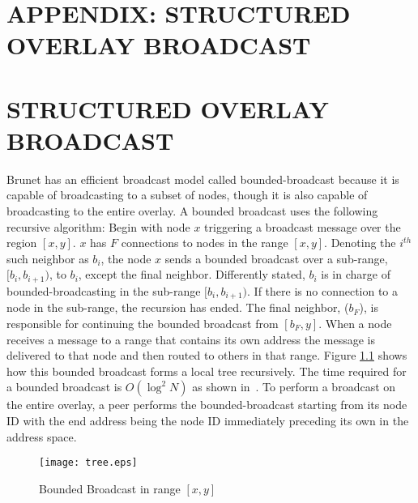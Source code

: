 %

{\chapter*{APPENDIX: STRUCTURED OVERLAY BROADCAST}
\label{broadcast}
\setcounter{chapter}{1}}
{\chapter{STRUCTURED OVERLAY BROADCAST}
\label{broadcast}}


Brunet has an efficient broadcast model called bounded-broadcast because it is
capable of broadcasting to a subset of nodes, though it is also capable of
broadcasting to the entire overlay.  A bounded broadcast uses the following
recursive algorithm:  Begin with node $x$ triggering a broadcast message over
the region $[x, y]$.  $x$ has $F$ connections to nodes in the range $[x, y]$.
Denoting the $i^{th}$ such neighbor as $b_i$, the node $x$ sends a bounded
broadcast over a sub-range, $[b_i, b_{i+1})$, to $b_i$, except the final
neighbor.  Differently stated, $b_i$ is in charge of bounded-broadcasting 
in the sub-range $[b_i, b_{i+1})$. If there is no connection to a node in the
sub-range, the recursion has ended.  The final neighbor, ($b_F$), is responsible
for continuing the bounded broadcast from $[b_F, y]$.  When a node receives a
message to a range that contains its own address the message is delivered to
that node and then routed to others in that range.  Figure \ref{fig:tree} shows
how this bounded broadcast forms a local tree recursively.   The time required
for a bounded broadcast is $O(\log^2 N)$ as shown in~\cite{small_world}.  To
perform a broadcast on the entire overlay, a peer performs the bounded-broadcast
starting from its node ID with the end address being the node ID immediately
preceding its own in the address space.  

\begin{figure}[ht]
\centering
\texttt{[image: tree.eps]}
\caption{Bounded Broadcast in range $[x, y]$}
\label{fig:tree}
\end{figure}
